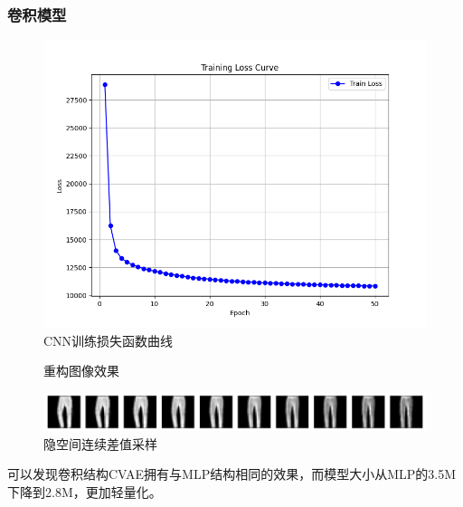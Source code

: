 \documentclass[12pt, a4paper, oneside]{ctexart}
\numberwithin{equation}{section}  %
\begin{document}
\subsubsection{卷积模型}
\begin{figure}[htbp]
    \centering
    \includegraphics[width=0.8\linewidth]{hw1_cnn_loss.png}
    \caption{CNN训练损失函数曲线}
\end{figure}
\begin{figure}[htbp]
  \centering
  \setlength{\abovecaptionskip}{0ex}  %
  \label{fig-1}
  \caption{重构图像效果}
\end{figure}
\begin{figure}[htbp]
    \centering
    \includegraphics[width=\linewidth]{hw1_cnn_smooth_test.png}
    \caption{隐空间连续差值采样}
\end{figure}
可以发现卷积结构CVAE拥有与MLP结构相同的效果，而模型大小从MLP的3.5M下降到2.8M，更加轻量化。
\end{document}
